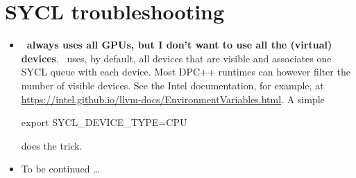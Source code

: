 \section{SYCL troubleshooting}
\begin{itemize}
  \item \textbf{\Peano\ always uses all GPUs, but I don't want to use all the
  (virtual) devices}.
  \Peano\ uses, by default, all devices that are visible and associates one SYCL
  queue with each device. Most DPC++ runtimes can however filter the number of
  visible devices. See the Intel documentation, for example, at
  \url{https://intel.github.io/llvm-docs/EnvironmentVariables.html}. A simple
  \begin{bash}
export SYCL_DEVICE_TYPE=CPU  
  \end{bash}
  does the trick.
  \item To be continued \dots
\end{itemize}




